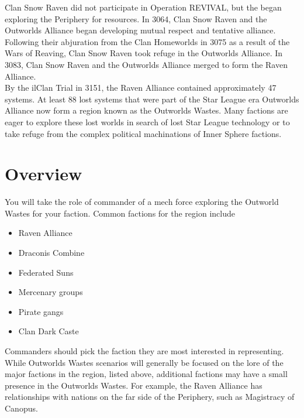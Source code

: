 \documentclass[UTF8]{article}
\begin{document}
Clan Snow Raven did not participate in Operation REVIVAL, but the began exploring the Periphery for resources.
In 3064, Clan Snow Raven and the Outworlds Alliance began developing mutual respect and tentative alliance.
Following their abjuration from the Clan Homeworlds in 3075 as a result of the Wars of Reaving, Clan Snow Raven took refuge in the Outworlds Alliance.
In 3083, Clan Snow Raven and the Outworlds Alliance merged to form the Raven Alliance.\\

By the ilClan Trial in 3151, the Raven Alliance contained approximately 47 systems.
At least 88 lost systems that were part of the Star League era Outworlds Alliance now form a region known as the Outworlds Wastes.
Many factions are eager to explore these lost worlds in search of lost Star League technology or to take refuge from the complex political machinations of Inner Sphere factions.\\

\section{Overview}

You will take the role of commander of a mech force exploring the Outworld Wastes for your faction.
Common factions for the region include

\begin{itemize}

\item Raven Alliance

\item Draconis Combine

\item Federated Suns

\item Mercenary groups

\item Pirate gangs

\item Clan Dark Caste

\end{itemize}

Commanders should pick the faction they are most interested in representing.
While Outworlds Wastes scenarios will generally be focused on the lore of the major factions in the region, listed above, additional factions may have a small presence in the Outworlds Wastes.
For example, the Raven Alliance has relationships with nations on the far side of the Periphery, such as Magistracy of Canopus.\\
\end{document}
